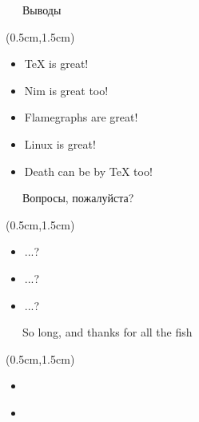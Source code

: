 \documentclass[xetex,18pt,aspectratio=43]{beamer}
\begin{document}
\begin{Large}
\begin{frame}{\ \ \ Выводы}
\begin{textblock*}{\framewidth-0.8cm}(0.5cm,1.5cm) %
\begin{itemize}
  \item TeX is great!
  \item Nim is great too!
  \item Flamegraphs are great!
  \item Linux is great!
  \item Death can be by {\TeX} too!
\end{itemize}
\end{textblock*}
\end{frame}

\begin{frame}{\ \ \ Вопросы, пожалуйста?}
\begin{textblock*}{\framewidth-0.8cm}(0.5cm,1.5cm)
\begin{itemize}
  \item ...?
  \item ...?
  \item ...?
\end{itemize}
\end{textblock*}
\end{frame}

\begin{frame}{\ \ \ So long, and thanks for all the fish}
\begin{textblock*}{\framewidth-0.8cm}(0.5cm,1.5cm)
\begin{itemize}
  \item \href{mailto:achistyakov@dataart.com}{\color{blue}{achistyakov@dataart.com}}
  \item \href{https://telegram.me/lhommequipleure}{\color{blue}{https://telegram.me/lhommequipleure}}
\end{itemize}
\end{textblock*}
\end{frame}
\end{Large}
\end{document}
